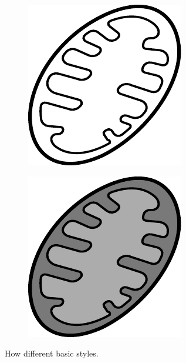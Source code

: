 \begin{figure}[H]
\begin{subfigure}[t]{0.2\linewidth}
    \end{subfigure}
    \begin{subfigure}[t]{0.2\linewidth}
        \includegraphics[width=\textwidth]{chapters/images/mitochondria-only-lines}
    \end{subfigure}
    \begin{subfigure}[t]{0.2\linewidth}
        \includegraphics[width=\textwidth]{chapters/images/mitochondria-greyscale}
    \end{subfigure}
    \caption{How different basic styles.}
    \label{fig:basic-styles}
\end{figure}

